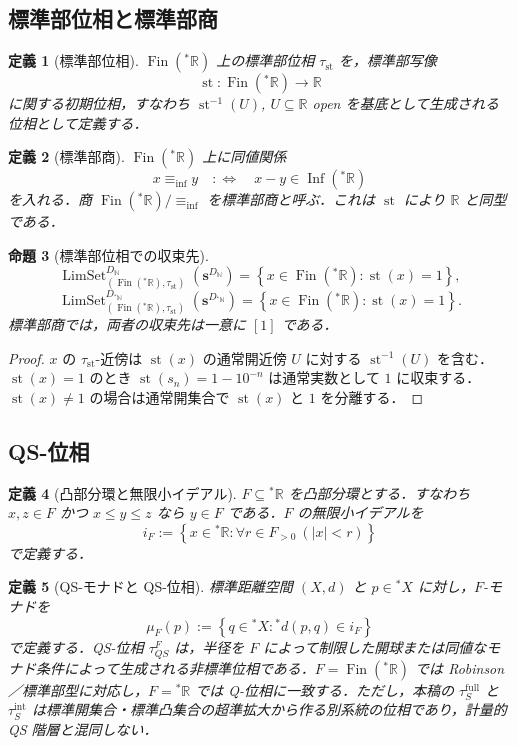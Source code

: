 \documentclass[a4paper,11pt]{ltjsarticle}
\theoremstyle{jpdef}
\newtheorem{definition}{定義}[section]
\theoremstyle{jpthm}
\newtheorem{proposition}[definition]{命題}
\newcommand{\N}{\mathbb{N}}
\newcommand{\R}{\mathbb{R}}
\newcommand{\LimSet}{\operatorname{LimSet}}
\newcommand{\st}{\operatorname{st}}
\newcommand{\Fin}{\operatorname{Fin}}
\newcommand{\Inf}{\operatorname{Inf}}
\newcommand{\DN}{D_{\N}}
\newcommand{\DStarN}{D_{{}^{\ast}\N}}
\newcommand{\set}[1]{\left\{#1\right\}}
\newcommand{\ulim}[1]{{}^{\ast}#1}
\newcommand{\taufullS}{\tau^{\mathrm{full}}_{S}}
\newcommand{\tauintS}{\tau^{\mathrm{int}}_{S}}
\newcommand{\taust}{\tau_{\mathrm{st}}}
\begin{document}
\subsection{標準部位相と標準部商}

\begin{definition}[標準部位相]
\(\Fin(\ulim\R)\) 上の標準部位相 \(\taust\) を，標準部写像
\[
  \st:\Fin(\ulim\R)\to\R
\]
に関する初期位相，すなわち \(\st^{-1}(U)\), \(U\subseteq\R\) open を基底として生成される位相として定義する．
\end{definition}

\begin{definition}[標準部商]
\(\Fin(\ulim\R)\) 上に同値関係
\[
  x\equiv_{\inf}y\quad:\Longleftrightarrow\quad x-y\in\Inf(\ulim\R)
\]
を入れる．商 \(\Fin(\ulim\R)/\equiv_{\inf}\) を標準部商と呼ぶ．これは \(\st\) により \(\R\) と同型である．
\end{definition}

\begin{proposition}[標準部位相での収束先]
\[
  \LimSet^{\DN}_{(\Fin(\ulim\R),\taust)}(\mathbf s^{\DN})
  =\set{x\in\Fin(\ulim\R):\st(x)=1},
\]
\[
  \LimSet^{\DStarN}_{(\Fin(\ulim\R),\taust)}(\mathbf s^{\DStarN})
  =\set{x\in\Fin(\ulim\R):\st(x)=1}.
\]
標準部商では，両者の収束先は一意に \([1]\) である．
\end{proposition}

\begin{proof}
\(x\) の \(\taust\)-近傍は \(\st(x)\) の通常開近傍 \(U\) に対する \(\st^{-1}(U)\) を含む．\(\st(x)=1\) のとき \(\st(s_n)=1-10^{-n}\) は通常実数として \(1\) に収束する．\(\st(x)\ne1\) の場合は通常開集合で \(\st(x)\) と \(1\) を分離する．
\end{proof}

\subsection{QS-位相}

\begin{definition}[凸部分環と無限小イデアル]
\(F\subseteq\ulim\R\) を凸部分環とする．すなわち \(x,z\in F\) かつ \(x\le y\le z\) なら \(y\in F\) である．\(F\) の無限小イデアルを
\[
  i_F:=\set{x\in\ulim\R:\forall r\in F_{>0}\ (|x|<r)}
\]
で定義する．
\end{definition}

\begin{definition}[QS-モナドと QS-位相]
標準距離空間 \((X,d)\) と \(p\in\ulim X\) に対し，\(F\)-モナドを
\[
  \mu_F(p):=\set{q\in\ulim X:\ulim d(p,q)\in i_F}
\]
で定義する．QS-位相 \(\tau^F_{QS}\) は，半径を \(F\) によって制限した開球または同値なモナド条件によって生成される非標準位相である．\(F=\Fin(\ulim\R)\) では Robinson／標準部型に対応し，\(F=\ulim\R\) では Q-位相に一致する．ただし，本稿の \(\taufullS\) と \(\tauintS\) は標準開集合・標準凸集合の超準拡大から作る別系統の位相であり，計量的 QS 階層と混同しない．
\end{definition}
\end{document}
